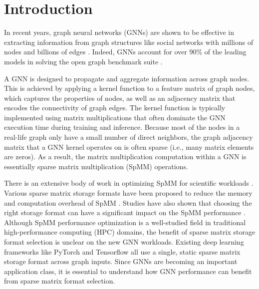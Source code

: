 \vspace{-6mm}
\section{Introduction}
\vspace{-3mm} In recent years, graph neural networks (GNNs) \cite{zhou2020graph} are shown to be effective in extracting information from graph structures like social networks with millions of nodes and billions of edges \cite{cui2018survey}. Indeed, GNNs account for over 90\% of the leading models in solving the open graph benchmark suite \cite{hu2020open,huang2021understanding}.

A GNN is designed to propagate and aggregate information across graph nodes. This is
achieved by applying a kernel function to a feature matrix of graph nodes, which captures the properties of nodes, as well as an adjacency matrix
that encodes the connectivity of graph edges. The kernel function is typically implemented using matrix multiplications \cite{zhou2020graph} that often dominate the GNN execution time during training and inference. Because most of the nodes in a real-life graph only have a small number of direct neighbors, the graph
adjacency matrix that a GNN kernel operates on is often sparse (i.e., many matrix elements are zeros). As a result, the matrix multiplication computation within a GNN is
essentially sparse matrix multiplication (SpMM) operations. 

There is an extensive body of work in optimizing SpMM for scientific workloads \cite{gilbert2008unified}. Various sparse matrix storage
formats have been proposed to reduce the memory and computation overhead of SpMM \cite{greathouse2014efficient,langr2015evaluation}.
Studies have also shown that choosing the right storage format can have a significant impact on the SpMM performance
\cite{mehrabi2021learning}. Although SpMM performance optimization is a well-studied field in traditional high-performance computing (HPC)
domains, the benefit of sparse matrix storage format selection is unclear on the new GNN workloads. Existing deep learning frameworks like
PyTorch \cite{paszke2019pytorch} and Tensorflow \cite{abadi2016tensorflow} all use a single, static sparse matrix storage format across
graph inputs. Since GNNs are becoming an important application class, it is essential to understand how GNN performance can benefit from
sparse matrix format selection.

